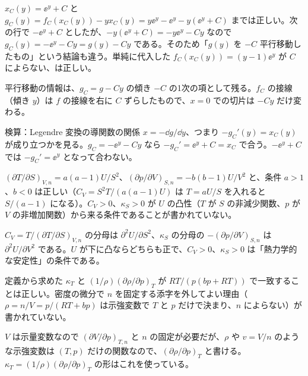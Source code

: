 \begin{kotaeran}
   $x_{C}(y)=\ee^{y}+C$ と $g_{C}(y)=f_{C}(x_{C}(y))-yx_{C}(y)=y\ee^{y}-\ee^{y}-y(\ee^{y}+C)$ までは正しい。次の行で $-\ee^{y}+C$ としたが、$-y(\ee^{y}+C)=-y\ee^{y}-Cy$ なので $g_{C}(y)=-\ee^{y}-Cy=g(y)-Cy$ である。そのため「$g(y)$ を $-C$ 平行移動したもの」という結論も違う。単純に代入した $f_{C}(x_{C}(y))=(y-1)\ee^{y}$ が $C$ によらない、は正しい。
\end{kotaeran}
\begin{rikai}
  \item 平行移動の情報は、$g_{C}=g-Cy$ の傾き $-C$ の1次の項として残る。$f_{C}$ の接線（傾き $y$）は $f$ の接線を右に $C$ ずらしたもので、$x=0$ での切片は $-Cy$ だけ変わる。
  \item 検算：Legendre 変換の導関数の関係 $x=-\dd g/\dd y$、つまり $-g_{C}'(y)=x_{C}(y)$ が成り立つかを見る。$g_{C}=-\ee^{y}-Cy$ なら $-g_{C}'=\ee^{y}+C=x_{C}$ で合う。$-\ee^{y}+C$ では $-g_{C}'=\ee^{y}$ となって合わない。
\end{rikai}
\begin{kotaeran}
   $(\partial T/\partial S)_{V,n}=a(a-1)U/S^{2}$、$(\partial p/\partial V)_{S,n}=-b(b-1)U/V^{2}$ と、条件 $a>1$、$b<0$ は正しい（$C_{V}=S^{2}T/(a(a-1)U)$ は $T=aU/S$ を入れると $S/(a-1)$ になる）。$C_{V}>0$、$\kappa_{S}>0$ が $U$ の凸性（$T$ が $S$ の非減少関数、$p$ が $V$ の非増加関数）から来る条件であることが書かれていない。
\end{kotaeran}
\begin{rikai}
  \item $C_{V}=T/(\partial T/\partial S)_{V,n}$ の分母は $\partial^{2}U/\partial S^{2}$、$\kappa_{S}$ の分母の $-(\partial p/\partial V)_{S,n}$ は $\partial^{2}U/\partial V^{2}$ である。$U$ が下に凸ならどちらも正で、$C_{V}>0$、$\kappa_{S}>0$ は「熱力学的な安定性」の条件である。
\end{rikai}
\begin{kotaeran}
   定義から求めた $\kappa_{T}$ と $(1/\rho)(\partial\rho/\partial p)_{T}$ が $RT/(p(bp+RT))$ で一致することは正しい。密度の微分で $n$ を固定する添字を外してよい理由（$\rho=n/V=p/(RT+bp)$ は示強変数で $T$ と $p$ だけで決まり、$n$ によらない）が書かれていない。
\end{kotaeran}
\begin{rikai}
  \item $V$ は示量変数なので $(\partial V/\partial p)_{T,n}$ と $n$ の固定が必要だが、$\rho$ や $v=V/n$ のような示強変数は $(T,p)$ だけの関数なので、$(\partial\rho/\partial p)_{T}$ と書ける。$\kappa_{T}=(1/\rho)(\partial\rho/\partial p)_{T}$ の形はこれを使っている。
\end{rikai}
